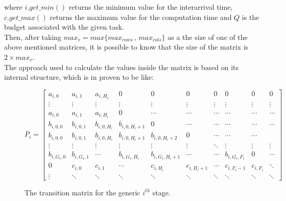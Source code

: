 where \( i.get\_min() \) returns the minimum value for the interarrival time, \( c.get\_max() \) returns the maximum value for the computation time and \( Q \) is the budget associated with the given task.\\
Then, after taking \( max_{v} = max\{max_{rows}\,,\,max_{cols}\} \) as a the size of one of the above mentioned matrices, it is possible to know that the size of the matrix is \( 2 \times max_{v} \).\\
The approach used to calculate the values inside the matrix is based on its internal structure, which is in proven\cite{pipelines} to be like:
\begin{figure}[H]
\begin{equation*} \label{transitionmatrix2}
  P_{i} = 
  \begin{bmatrix}
    a_{i,0} & a_{i,1} & a_{i,H_{i}} & 0 & 0 & 0 & 0 & 0 & 0 & 0 \\
    \vdots & \vdots & \vdots & \vdots & \vdots & \vdots & \vdots & \vdots & \vdots & \vdots\\
    a_{i,0} & a_{i,1} & a_{i,H_{i}} & 0 & \cdots & \cdots & \cdots & \cdots & \cdots & \cdots \\
    b_{i,0,0} & b_{i,0,1} & b_{i,0,H_{i}} & b_{i,0,H_{i}+1} & 0 & \cdots & \cdots & \cdots & \cdots & \cdots \\
    b_{i,0,0} & b_{i,0,1} & b_{i,0,H_{i}} & b_{i,0,H_{i}+1} & b_{i,0,H_{i}+2} & 0 & \cdots & \cdots & \cdots \\
    \vdots & \vdots & \vdots & \vdots & \vdots & \vdots & \ddots & \vdots & \vdots & \vdots \\
    b_{i,G_{i},0} & b_{i,G_{i},1} & \cdots & b_{i,G_{i},H_{i}} & b_{i,G_{i},H_{i}+1} & \cdots & \cdots & b_{i,G_{i},F_{i}} & 0 & \cdots \\
    0 & c_{i,0} & c_{i,1} & \cdots & c_{i,H_{i}} & c_{i,H_{i}+1} & \cdots & c_{i,F_{i}-1} & c_{i,F_{i}} & \ddots \\
    \vdots & \ddots & \ddots & \ddots & \ddots & \ddots & \ddots & \ddots & \ddots & \ddots
  \end{bmatrix}
\end{equation*}
\caption{The transition matrix for the generic \( i^{th} \) stage.}
\end{figure}

